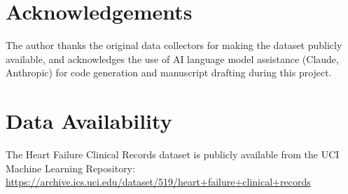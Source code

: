 \documentclass[12pt, a4paper]{article}
\begin{document}
\section*{Acknowledgements}
The author thanks the original data collectors \cite{ahmad2017} for making 
the dataset publicly available, and acknowledges the use of AI language model 
assistance (Claude, Anthropic) for code generation and manuscript drafting 
during this project.

\section*{Data Availability}
The Heart Failure Clinical Records dataset is publicly available from the UCI 
Machine Learning Repository: 
\url{https://archive.ics.uci.edu/dataset/519/heart+failure+clinical+records}
\end{document}
